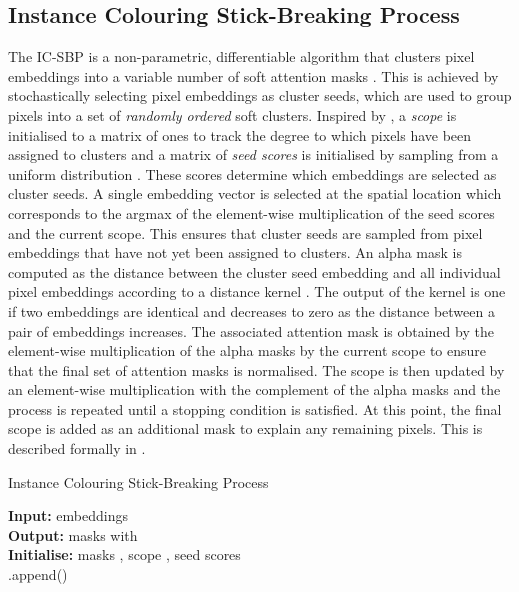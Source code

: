 \documentclass{article}
\begin{document}
\subsection{Instance Colouring Stick-Breaking Process}
\label{ch:gpp:sec:icsbp}
The IC-SBP is a non-parametric, differentiable algorithm that clusters pixel embeddings \mbox{} into a variable number of soft attention masks .
This is achieved by stochastically selecting pixel embeddings as cluster seeds, which are used to group pixels into a set of \emph{randomly ordered} soft clusters.
Inspired by \citet{burgess2019monet}, a \emph{scope}  is initialised to a matrix of ones  to track the degree to which pixels have been assigned to clusters and a matrix of \emph{seed scores} is initialised by sampling from a uniform distribution .
These scores determine which embeddings are selected as cluster seeds.
A single embedding vector  is selected at the spatial location  which corresponds to the argmax of the element-wise multiplication of the seed scores and the current scope.
This ensures that cluster seeds are sampled from pixel embeddings that have not yet been assigned to clusters.
An alpha mask  is computed as the distance between the cluster seed embedding  and all individual pixel embeddings according to a distance kernel .
The output of the kernel  is one if two embeddings are identical and decreases to zero as the distance between a pair of embeddings increases.
The associated attention mask  is obtained by the element-wise multiplication of the alpha masks by the current scope to ensure that the final set of attention masks is normalised.
The scope is then updated by an element-wise multiplication with the complement of the alpha masks and the process is repeated until a stopping condition is satisfied.
At this point, the final scope is added as an additional mask to explain any remaining pixels.
This is described formally in .

\begin{algorithm}
	\caption{Instance Colouring Stick-Breaking Process}
	\label{alg:gpp:ic-sbp}
	\SetAlgoLined
	\textbf{Input:} embeddings \\
	\textbf{Output:} masks  with \\
	\textbf{Initialise:} masks , scope , seed scores \\
	\BlankLine
	.append()
\end{algorithm}
\end{document}
